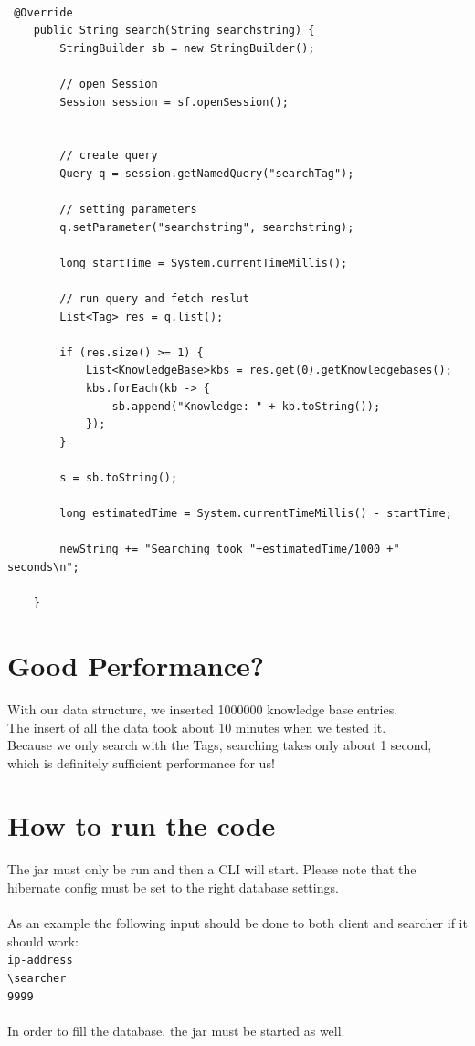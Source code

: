 \documentclass[12pt]{article}
\begin{document}
\begin{lstlisting}[caption=Search method of the Service, label=generateEntry]

 @Override
    public String search(String searchstring) {
        StringBuilder sb = new StringBuilder();

        // open Session
        Session session = sf.openSession();


        // create query
        Query q = session.getNamedQuery("searchTag");

        // setting parameters
        q.setParameter("searchstring", searchstring);

        long startTime = System.currentTimeMillis();

        // run query and fetch reslut
        List<Tag> res = q.list();

        if (res.size() >= 1) {
            List<KnowledgeBase>kbs = res.get(0).getKnowledgebases();
            kbs.forEach(kb -> {
                sb.append("Knowledge: " + kb.toString());
            });
        }
        
        s = sb.toString();

        long estimatedTime = System.currentTimeMillis() - startTime;

        newString += "Searching took "+estimatedTime/1000 +" seconds\n";

    }
    \end{lstlisting}
\section{Good Performance?}
With our data structure, we inserted 1000000 knowledge base entries. \\
The insert of all the data took about 10 minutes when we tested it.
\\
Because we only search with the Tags, searching takes only about 1 second, which is definitely sufficient performance for us! 

\section{How to run the code}
The jar must only be run and then a CLI will start. Please note that the hibernate config must be set to the right database settings.\\
\\
As an example the following input should be done to both client and searcher if it should work:\\
\texttt{ip-address}\\
\texttt{\textbackslash searcher}\\
\texttt{9999}\\\\
In order to fill the database, the jar must be started as well.
\end{document}
